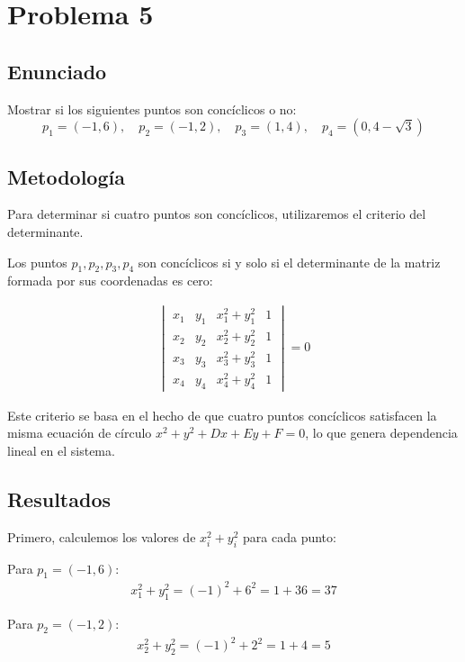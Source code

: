 \documentclass{article}
\begin{document}
\section{Problema 5}

\subsection{Enunciado}
Mostrar si los siguientes puntos son concíclicos o no:
$$p_1 = (-1, 6), \quad p_2 = (-1, 2), \quad p_3 = (1, 4), \quad p_4 = (0, 4 - \sqrt{3})$$

\subsection{Metodología}
Para determinar si cuatro puntos son concíclicos, utilizaremos el criterio del determinante. 

Los puntos $p_1, p_2, p_3, p_4$ son concíclicos si y solo si el determinante de la matriz formada por sus coordenadas es cero:

\begin{align}
\begin{vmatrix}
x_1 & y_1 & x_1^2 + y_1^2 & 1 \\
x_2 & y_2 & x_2^2 + y_2^2 & 1 \\
x_3 & y_3 & x_3^2 + y_3^2 & 1 \\
x_4 & y_4 & x_4^2 + y_4^2 & 1
\end{vmatrix} = 0
\end{align}

Este criterio se basa en el hecho de que cuatro puntos concíclicos satisfacen la misma ecuación de círculo $x^2 + y^2 + Dx + Ey + F = 0$, lo que genera dependencia lineal en el sistema.

\subsection{Resultados}
\setcounter{equation}{0}

Primero, calculemos los valores de $x_i^2 + y_i^2$ para cada punto:

Para $p_1 = (-1, 6)$:
\begin{align}
x_1^2 + y_1^2 = (-1)^2 + 6^2 = 1 + 36 = 37
\end{align}

Para $p_2 = (-1, 2)$:
\begin{align}
x_2^2 + y_2^2 = (-1)^2 + 2^2 = 1 + 4 = 5
\end{align}
\end{document}
